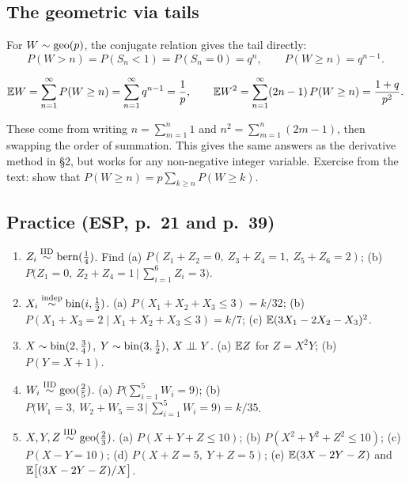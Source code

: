 \subsection{The geometric via tails}

For $W\sim\operatorname{geo}(p)$, the conjugate relation gives the tail directly:
\[
P(W > n) = P(S_n < 1) = P(S_n = 0) = q^n, \qquad P(W \ge n) = q^{n-1}.
\]

\begin{proposition}
\[
\mathbb{E} W = \sum_{n=1}^{\infty} P(W\ge n) = \sum_{n=1}^\infty q^{n-1} = \frac1p,
\qquad
\mathbb{E} W^2 = \sum_{n=1}^\infty (2n-1)\,P(W\ge n) = \frac{1+q}{p^2}.
\]
\end{proposition}
\begin{remark}
These come from writing $n = \sum_{m=1}^{n} 1$ and $n^2 = \sum_{m=1}^{n}(2m-1)$, then swapping the order of summation. This gives the same answers as the derivative method in \S2, but works for any non-negative integer variable. Exercise from the text: show that $P(W\ge n) = p\sum_{k\ge n}P(W\ge k)$.
\end{remark}

\subsection{Practice (ESP, p.\ 21 and p.\ 39)}

\begin{enumerate}[label=\textbf{P\arabic*.},leftmargin=*]
  \item $Z_i \overset{\text{IID}}{\sim} \operatorname{bern}(\tfrac14)$. Find (a) $P(Z_1+Z_2=0,\ Z_3+Z_4=1,\ Z_5+Z_6=2)$; (b) $P\big(Z_1=0,\ Z_2+Z_4=1 \,\big|\, \sum_{i=1}^6 Z_i=3\big)$.
  \item $X_i \overset{\text{indep}}{\sim}\operatorname{bin}(i,\tfrac12)$. (a) $P(X_1+X_2+X_3\le3)=k/32$; (b) $P(X_1+X_3=2\mid X_1+X_2+X_3\le3)=k/7$; (c) $\mathbb{E}(3X_1-2X_2-X_3)^2$.
  \item $X\sim\operatorname{bin}(2,\tfrac34)$, $Y\sim\operatorname{bin}(3,\tfrac12)$, $X\perp\!\!\!\perp Y$. (a) $\mathbb{E} Z$ for $Z = X^2Y$; (b) $P(Y=X+1)$.
  \item $W_i\overset{\text{IID}}{\sim}\operatorname{geo}(\tfrac25)$. (a) $P\big(\sum_{i=1}^5W_i=9\big)$; (b) $P\big(W_1=3,\ W_2+W_5=3\,\big|\,\sum_{i=1}^5W_i=9\big)=k/35$.
  \item $X,Y,Z\overset{\text{IID}}{\sim}\operatorname{geo}(\tfrac23)$. (a) $P(X+Y+Z\le10)$; (b) $P(X^2+Y^2+Z^2\le10)$; (c) $P(X-Y=10)$; (d) $P(X+Z=5,\ Y+Z=5)$; (e) $\mathbb{E}(3X-2Y-Z)$ and $\mathbb{E}\big[(3X-2Y-Z)/X\big]$.
\end{enumerate}

\newpage
